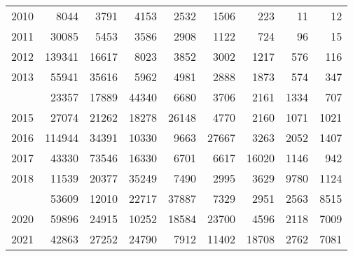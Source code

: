 \documentclass[
]{article}
\begin{document}
\begin{longtable}[t]{lrrrrrrrr}
2010 & 8044 & 3791 & 4153 & 2532 & 1506 & 223 & 11 & 12\\
2011 & 30085 & 5453 & 3586 & 2908 & 1122 & 724 & 96 & 15\\
2012 & 139341 & 16617 & 8023 & 3852 & 3002 & 1217 & 576 & 116\\
2013 & 55941 & 35616 & 5962 & 4981 & 2888 & 1873 & 574 & 347\\
\addlinespace
2014 & 23357 & 17889 & 44340 & 6680 & 3706 & 2161 & 1334 & 707\\
2015 & 27074 & 21262 & 18278 & 26148 & 4770 & 2160 & 1071 & 1021\\
2016 & 114944 & 34391 & 10330 & 9663 & 27667 & 3263 & 2052 & 1407\\
2017 & 43330 & 73546 & 16330 & 6701 & 6617 & 16020 & 1146 & 942\\
2018 & 11539 & 20377 & 35249 & 7490 & 2995 & 3629 & 9780 & 1124\\
\addlinespace
2019 & 53609 & 12010 & 22717 & 37887 & 7329 & 2951 & 2563 & 8515\\
2020 & 59896 & 24915 & 10252 & 18584 & 23700 & 4596 & 2118 & 7009\\
2021 & 42863 & 27252 & 24790 & 7912 & 11402 & 18708 & 2762 & 7081\\*
\end{longtable}
\end{document}
